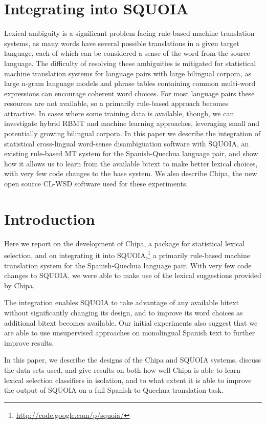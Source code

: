 \section{Integrating into SQUOIA}

Lexical ambiguity is a significant problem facing rule-based machine
translation systems, as many words have several possible translations in a
given target language, each of which can be considered a sense of the word from
the source language.
The difficulty of resolving these ambiguities is mitigated for 
statistical machine translation systems for language pairs with large bilingual
corpora, as large n-gram language models and phrase tables containing common
multi-word expressions can encourage coherent word choices.
For most language pairs these resources are not available, so a primarily
rule-based approach becomes attractive.
In cases where some training data is available, though, we can
investigate hybrid RBMT and machine learning approaches, leveraging small and
potentially growing bilingual corpora. In this paper we
describe the integration of statistical cross-lingual word-sense disambiguation
software with SQUOIA, an existing rule-based MT system for the Spanish-Quechua
language pair, and show how it allows us to learn from the available bitext to
make better lexical choices, with very few code changes to the base system. We
also describe Chipa, the new open source CL-WSD software used for these
experiments.



\section{Introduction}
Here we report on the development of Chipa, a package for statistical
lexical selection, and on integrating it into
SQUOIA,\footnote{\url{http://code.google.com/p/squoia/}} a primarily rule-based
machine translation system for the Spanish-Quechua language pair.  With very
few code changes to SQUOIA, we were able to make use of the lexical suggestions
provided by Chipa.

The integration enables SQUOIA to take advantage of any available bitext
without significantly changing its design, and to improve its word choices as
additional bitext becomes available. Our initial experiments also suggest that
we are able to use unsupervised approaches on monolingual Spanish text to
further improve results.

In this paper, we describe the designs of the Chipa and SQUOIA systems, discuss
the data sets used, and give results on both how well Chipa is able to learn
lexical selection classifiers in isolation, and to what extent it is able to
improve the output of SQUOIA on a full Spanish-to-Quechua translation task.

